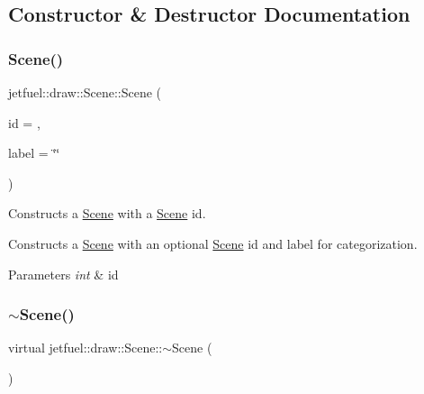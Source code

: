 \subsection{Constructor \& Destructor Documentation}
\mbox{\label{classjetfuel_1_1draw_1_1Scene_ad27192ba7e5f0cb23b55f5ba067cbe94}} 
\subsubsection{\texorpdfstring{Scene()}{Scene()}}
{\footnotesize\ttfamily jetfuel\+::draw\+::\+Scene\+::\+Scene (\begin{DoxyParamCaption}\item[{const int}]{id = {},  }\item[{const std\+::string}]{label = {\ttfamily \char`\"{}\char`\"{}} }\end{DoxyParamCaption})}



Constructs a \hyperlink{classjetfuel_1_1draw_1_1Scene}{Scene} with a \hyperlink{classjetfuel_1_1draw_1_1Scene}{Scene} id. 

Constructs a \hyperlink{classjetfuel_1_1draw_1_1Scene}{Scene} with an optional \hyperlink{classjetfuel_1_1draw_1_1Scene}{Scene} id and label for categorization.


\begin{DoxyParams}{Parameters}
{\em int} & id \\
\hline
\end{DoxyParams}
\mbox{\label{classjetfuel_1_1draw_1_1Scene_ac3e990c0deba1b5bb8d0552033a4ad81}} 
\subsubsection{\texorpdfstring{$\sim$\+Scene()}{~Scene()}}
{\footnotesize\ttfamily virtual jetfuel\+::draw\+::\+Scene\+::$\sim$\+Scene (\begin{DoxyParamCaption}{ }\end{DoxyParamCaption})\hspace{0.3cm}{\ttfamily [virtual]}}



